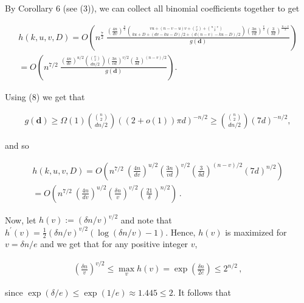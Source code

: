 By Corollary 6 (see (3)), we can collect all binomial coefficients together to get\par


\[\begin{gathered}
\displaystyle h(k,u,v,D) \displaystyle= \displaystyle O\left(n^{\frac{7}{2}}\ \frac{\left(\frac{4n}{dv}\right)^{\frac{u}{2}}\binom{vu+(n-v-u)v+{v\choose 2}+{n-v\choose 2}}{ku+D+(dv-ku-D)/2+(d(n-v)-ku-D)/2}\left(\frac{3n}{vd}\right)^{\frac{v}{2}}\left(\frac{3}{\delta d}\right)^{\frac{n-v}{2}}}{g(\mathbf{d})}\right) \\
\displaystyle= \displaystyle O\left(n^{7/2}\ \frac{\left(\frac{4n}{dv}\right)^{u/2}\binom{{n\choose 2}}{dn/2}\left(\frac{3n}{vd}\right)^{v/2}\left(\frac{3}{\delta d}\right)^{(n-v)/2}}{g(\mathbf{d})}\right).
\end{gathered}\]


Using (8) we get that\par


\[\begin{gathered}
g(\mathbf{d})\geq\Omega(1)\binom{{n\choose 2}}{dn/2}((2+o(1))\pi d)^{-n/2}\geq\binom{{n\choose 2}}{dn/2}(7d)^{-n/2},
\end{gathered}\]


and so\par


\[\begin{gathered}
\displaystyle h(k,u,v,D) \displaystyle= \displaystyle O\left(n^{7/2}\ \left(\frac{4n}{dv}\right)^{u/2}\left(\frac{3n}{vd}\right)^{v/2}\left(\frac{3}{\delta d}\right)^{(n-v)/2}(7d)^{n/2}\right) \\
\displaystyle= \displaystyle O\left(n^{7/2}\ \left(\frac{4n}{dv}\right)^{u/2}\left(\frac{\delta n}{v}\right)^{v/2}\left(\frac{21}{\delta}\right)^{n/2}\right)\,.
\end{gathered}\]


Now, let $h(v):=(\delta n/v)^{v/2}$ and note that $h^{\prime}(v)=\frac{1}{2}(\delta n/v)^{v/2}(\log(\delta n/v)-1)$. Hence, $h(v)$ is maximized for $v=\delta n/e$ and we get that for any positive integer $v$,\par


\[\begin{gathered}
\left(\frac{\delta n}{v}\right)^{v/2}\leq\max_{v}h(v)=\exp\left(\frac{\delta n}{2e}\right)\leq 2^{n/2}\,,
\end{gathered}\]


since $\exp(\delta/e)\leq\exp(1/e)\approx 1.445\leq 2$. It follows that\par


